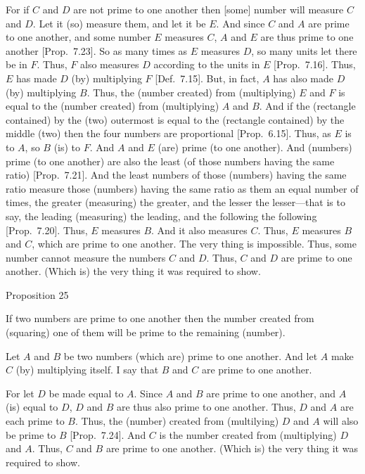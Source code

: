 For if $C$ and $D$ are not prime to one another then [some] number will
measure $C$ and $D$. Let it (so) measure them, and let it be $E$. And since
$C$ and $A$ are prime to one another, and some number $E$ measures $C$, $A$ and $E$
are thus prime to one another  [Prop.~7.23].
So as many times as $E$ measures $D$, so many units let there be in $F$.
Thus, $F$ also measures $D$ according to the units in $E$ [Prop.~7.16]. Thus, $E$ has made $D$ (by) multiplying
$F$ [Def.~7.15]. But, in fact, $A$ has also made
$D$ (by) multiplying $B$.
 Thus, the (number created) from (multiplying) $E$ and $F$ is equal to the  (number created) from (multiplying) $A$ and $B$. And if the (rectangle contained) by the (two)
outermost is equal to the (rectangle contained) by the middle (two) then the
four numbers are proportional [Prop.~6.15].
Thus, as $E$ is to $A$, so $B$  (is) to $F$. And $A$ and $E$ (are) prime (to one another).
And (numbers) prime (to one another) are also the least (of those numbers having the same ratio)
[Prop.~7.21]. And the least numbers of those
(numbers) having the same ratio  measure those (numbers)
having the same ratio as them an equal number of times,
the greater (measuring) the greater, and the lesser the lesser---that is
to say, the leading (measuring) the leading, and the following the
following [Prop.~7.20]. Thus, $E$
measures $B$.  And it also measures $C$. Thus, $E$ measures $B$ and $C$, which
are prime to one another. The very thing is impossible. Thus, some
number cannot measure the numbers $C$ and $D$. Thus, $C$ and
$D$ are prime to one another. (Which is) the very thing it was required
to show.


\begin{center}
{\large Proposition 25}
\end{center}

If two numbers are prime to one another then the
number created from (squaring) one of them will be prime to
the remaining (number).


Let $A$ and $B$ be two numbers (which are) prime to one another. And let $A$ make $C$ (by) multiplying itself. I say that $B$ and $C$ are prime to one
another.

\epsfysize=2in
\centerline{}

For let $D$ be made equal to $A$. Since $A$ and $B$ are prime to one another, and
$A$ (is) equal to $D$, $D$ and $B$ are thus also prime to one another. Thus, $D$ and
$A$ are each prime to $B$. Thus, the (number) created from (multilying)
$D$ and $A$ will also be prime to $B$ [Prop.~7.24].
And $C$ is the number created from (multiplying) $D$ and $A$. Thus,
$C$ and $B$ are prime to one another. (Which is) the very thing it was required
to show.

